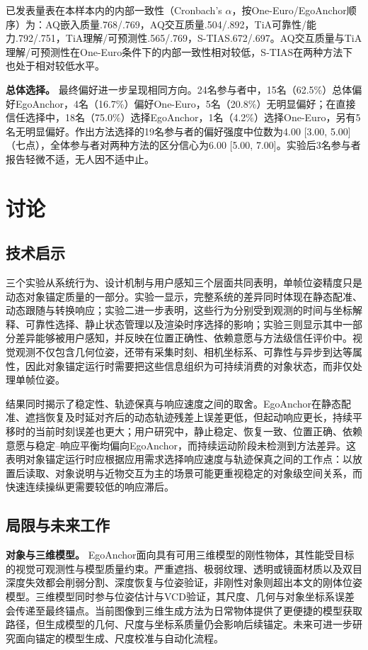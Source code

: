 \documentclass[review]{vgtc}
\begin{document}
已发表量表在本样本内的内部一致性（Cronbach's $\alpha$，按One-Euro/EgoAnchor顺序）为：AQ嵌入质量.768/.769，AQ交互质量.504/.892，TiA可靠性/能力.792/.751，TiA理解/可预测性.565/.769，S-TIAS.672/.697。AQ交互质量与TiA理解/可预测性在One-Euro条件下的内部一致性相对较低，S-TIAS在两种方法下也处于相对较低水平。

\textbf{总体选择。}
最终偏好进一步呈现相同方向。24名参与者中，15名（62.5\%）总体偏好EgoAnchor，4名（16.7\%）偏好One-Euro，5名（20.8\%）无明显偏好；在直接信任选择中，18名（75.0\%）选择EgoAnchor，1名（4.2\%）选择One-Euro，另有5名无明显偏好。作出方法选择的19名参与者的偏好强度中位数为4.00 [3.00, 5.00]（七点），全体参与者对两种方法的区分信心为6.00 [5.00, 7.00]。实验后3名参与者报告轻微不适，无人因不适中止。

\section{讨论}\label{sec:discussion}

\subsection{技术启示}

三个实验从系统行为、设计机制与用户感知三个层面共同表明，单帧位姿精度只是动态对象锚定质量的一部分。实验一显示，完整系统的差异同时体现在静态配准、动态跟随与转换响应；实验二进一步表明，这些行为分别受到观测的时间与坐标解释、可靠性选择、静止状态管理以及渲染时序选择的影响；实验三则显示其中一部分差异能够被用户感知，并反映在位置正确性、依赖意愿与方法级信任评价中。视觉观测不仅包含几何位姿，还带有采集时刻、相机坐标系、可靠性与异步到达等属性，因此对象锚定运行时需要把这些信息组织为可持续消费的对象状态，而非仅处理单帧位姿。

结果同时揭示了稳定性、轨迹保真与响应速度之间的取舍。EgoAnchor在静态配准、遮挡恢复及时延对齐后的动态轨迹残差上误差更低，但起动响应更长，持续平移时的当前时刻误差也更大；用户研究中，静止稳定、恢复一致、位置正确、依赖意愿与稳定--响应平衡均偏向EgoAnchor，而持续运动阶段未检测到方法差异。这表明对象锚定运行时应根据应用需求选择响应速度与轨迹保真之间的工作点：以放置后读取、对象说明与近物交互为主的场景可能更重视稳定的对象级空间关系，而快速连续操纵更需要较低的响应滞后。

\subsection{局限与未来工作}

\textbf{对象与三维模型。}
EgoAnchor面向具有可用三维模型的刚性物体，其性能受目标的视觉可观测性与模型质量约束。严重遮挡、极弱纹理、透明或镜面材质以及双目深度失效都会削弱分割、深度恢复与位姿验证，非刚性对象则超出本文的刚体位姿模型。三维模型同时参与位姿估计与VCD验证，其尺度、几何与对象坐标系误差会传递至最终锚点。当前图像到三维生成方法为日常物体提供了更便捷的模型获取路径，但生成模型的几何、尺度与坐标系质量仍会影响后续锚定。未来可进一步研究面向锚定的模型生成、尺度校准与自动化流程。
\end{document}
